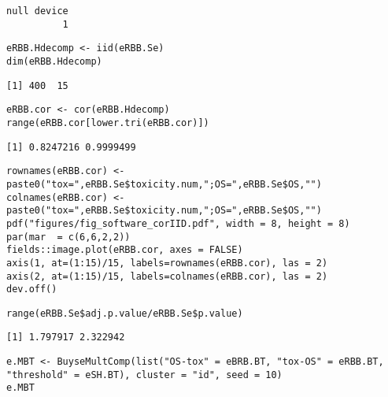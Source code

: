 \documentclass[12pt]{article}
\begin{document}
\begin{verbatim}
null device 
          1
\end{verbatim}



\lstset{language=r,label= ,caption= ,captionpos=b,numbers=none}
\begin{lstlisting}
eRBB.Hdecomp <- iid(eRBB.Se)
dim(eRBB.Hdecomp)
\end{lstlisting}

\begin{verbatim}
[1] 400  15
\end{verbatim}


\lstset{language=r,label= ,caption= ,captionpos=b,numbers=none}
\begin{lstlisting}
eRBB.cor <- cor(eRBB.Hdecomp)
range(eRBB.cor[lower.tri(eRBB.cor)])
\end{lstlisting}

\begin{verbatim}
[1] 0.8247216 0.9999499
\end{verbatim}


\lstset{language=r,label= ,caption= ,captionpos=b,numbers=none}
\begin{lstlisting}
rownames(eRBB.cor) <- paste0("tox=",eRBB.Se$toxicity.num,";OS=",eRBB.Se$OS,"")
colnames(eRBB.cor) <- paste0("tox=",eRBB.Se$toxicity.num,";OS=",eRBB.Se$OS,"")
pdf("figures/fig_software_corIID.pdf", width = 8, height = 8)
par(mar  = c(6,6,2,2))
fields::image.plot(eRBB.cor, axes = FALSE)
axis(1, at=(1:15)/15, labels=rownames(eRBB.cor), las = 2)
axis(2, at=(1:15)/15, labels=colnames(eRBB.cor), las = 2)
dev.off()
\end{lstlisting}

\lstset{language=r,label= ,caption= ,captionpos=b,numbers=none}
\begin{lstlisting}
range(eRBB.Se$adj.p.value/eRBB.Se$p.value)
\end{lstlisting}

\begin{verbatim}
[1] 1.797917 2.322942
\end{verbatim}





\lstset{language=r,label= ,caption= ,captionpos=b,numbers=none}
\begin{lstlisting}
e.MBT <- BuyseMultComp(list("OS-tox" = eBRB.BT, "tox-OS" = eRBB.BT, "threshold" = eSH.BT), cluster = "id", seed = 10)
e.MBT
\end{lstlisting}
\end{document}
